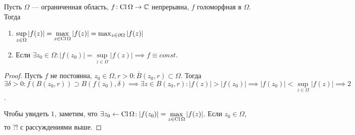 \begin{consequence}
   Пусть  $\Omega$ --- ограниченная область,  $f\!: \operatorname{Cl} \Omega \to \mathbb{C}$ непрерывна,  $f$ голоморфная в  $\Omega$. Тогда
   \begin{enumerate}
       \item $\sup\limits_{z \in \Omega} |f(z)| = \max\limits_{z \in \operatorname{Cl} \Omega} |f(z)| = \max_{z \in \partial \Omega} |f(z)|$
       \item Если $\exists z_0 \in \Omega\!: |f(z_0)| = \sup\limits_{z \in \Omega} |f(z)| \implies f \equiv const$.
   \end{enumerate}
\end{consequence}
\begin{proof}
    Пусть $f$ не постоянна,  $z_0 \in \Omega, r > 0\!: \overline{B}(z_0, r) \subset \Omega$. Тогда $\exists \delta > 0\!: f(B(z_0, r)) \supset B(f(z_0), \delta) \implies \exists z \in B(z_0, r)\!: |f(z)| > |f(z_0)| \implies |f(z_0)| < \sup\limits_{z \in \Omega} |f(z)| \implies 2$.

    Чтобы увидеть $1$, заметим, что  $\exists z_0 \leftarrow \operatorname{Cl} \Omega\!: |f(z_0)| = \max\limits_{z \in \operatorname{Cl} \Omega} |f(z)|$. Если $z_0 \in \Omega$, то ?! с рассуждениями выше.
\end{proof}


